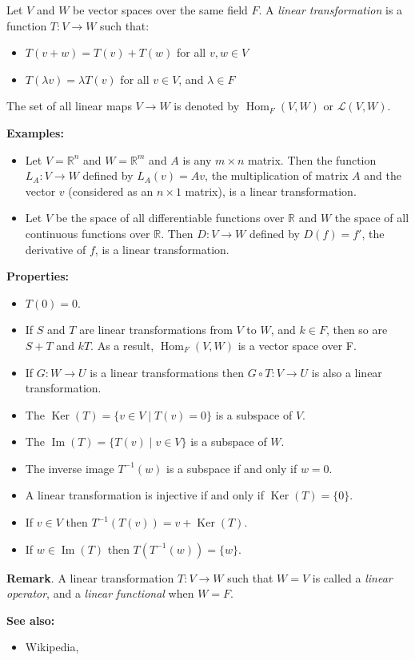 \documentclass{article}
\def\Ker{\operatorname{Ker}}
\def\Im{\operatorname{Im}}
\def\Hom{\operatorname{Hom}}
\begin{document}

Let $V$ and $W$ be vector spaces over the same field $F$. A \emph{linear transformation} is a function $T\colon V \to W$ such that:
\begin{itemize}
  \item $T(v+w) = T(v)+T(w)$ for all $v,w \in V$
  \item $T(\lambda v) = \lambda T(v)$ for all $v\in V$, and $\lambda \in F$
\end{itemize}
The set of all linear maps $V \to W$ is denoted by $\Hom_F(V,W)$ or $\mathscr{L}(V,W)$.

\textbf{Examples:}
\begin{itemize}
\item Let $V=\mathbb{R}^n$ and $W=\mathbb{R}^m$ and $A$ is any $m\times n$ matrix.  Then the function $L_A:V\to W$ defined by $L_A(v)=Av$, the multiplication of matrix $A$ and the vector $v$ (considered as an $n\times 1$ matrix), is a linear transformation.
\item Let $V$ be the space of all differentiable functions over $\mathbb{R}$ and $W$ the space of all continuous functions over $\mathbb{R}$.  Then $D:V\to W$ defined by $D(f)=f'$, the derivative of $f$, is a linear transformation.
\end{itemize}

\noindent \textbf{Properties:}
\begin{itemize}
  \item $T(0) = 0$.
  \item If $S$ and $T$ are linear transformations from $V$ to $W$, and $k\in F$, then so are $S+T$ and $kT$.  As a result, $\Hom_F(V,W)$ is a vector space over F.
  \item If $G\colon W\to U$ is a linear transformations then $G\circ T\colon V\to U$ is also a linear transformation.
  \item The 
$\Ker(T)=\{v\in V \mid T(v) = 0\}$ is a subspace of $V$.
  \item The  $\Im(T) = \{T(v) \mid v\in V\}$ is a subspace of $W$.
  \item The inverse image $T^{-1}(w)$ is a subspace if and only if $w=0$.
  \item A linear transformation is injective if and only if $\Ker(T)=\{0\}$.
  \item If $v \in V$ then $T^{-1}(T(v)) = v + \Ker(T)$.
  \item If $w\in \Im(T)$ then $T(T^{-1}(w)) = \{w\}$.
\end{itemize}

\textbf{Remark}.  A linear transformation $T:V\to W$ such that $W=V$ is called a \emph{linear operator}, and a \emph{linear functional} when $W=F$.

\textbf{See also:}
\begin{itemize}
\item Wikipedia, 
\end{itemize}
\end{document}
